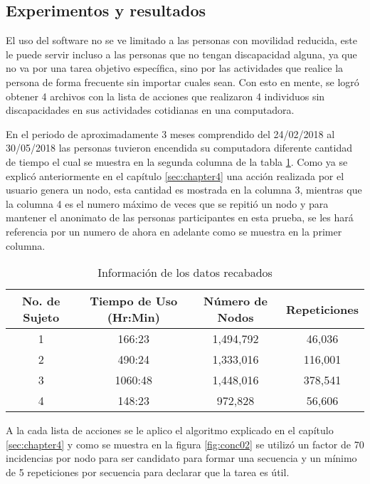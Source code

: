 \subsection{Experimentos y resultados}

El uso del software no se ve limitado a las personas con movilidad reducida, este le puede servir incluso a las personas que no tengan discapacidad alguna, ya que no va por una tarea objetivo espec\'ifica, sino por las actividades que realice la persona de forma frecuente sin importar cuales sean. Con esto en mente, se logr\'o obtener 4 archivos con la lista de acciones que realizaron 4 individuos sin discapacidades en sus actividades cotidianas en una computadora.


En el periodo de aproximadamente 3 meses comprendido del 24/02/2018 al 30/05/2018 las personas tuvieron encendida su computadora diferente cantidad de tiempo el cual se muestra en la segunda columna de la tabla \ref{infodata}. Como ya se explic\'o anteriormente en el cap\'itulo \ref{sec:chapter4} una acci\'on realizada por el usuario genera un nodo, esta cantidad es mostrada en la columna 3, mientras que la columna 4 es el numero m\'aximo de veces que se repiti\'o un nodo y para mantener el anonimato de las personas participantes en esta prueba, se les har\'a referencia por un numero de ahora en adelante como se muestra en la primer columna. 


\begin{table}[]
\centering
\begin{tabular}{cccc}
\hline
		No. de Sujeto	&   Tiempo de Uso (Hr:Min)		&	N\'umero de Nodos	&   Repeticiones 	\\   \hline
		1				&	166:23 						&	1,494,792			&	46,036				\\
		2				&	490:24						&	1,333,016			&	116,001				\\
		3				&	1060:48						&	1,448,016			&	378,541				\\
		4				&	148:23						&	972,828				&	56,606				\\ 
\hline
\end{tabular}
\caption{Informaci\'on de los datos recabados}
\label{infodata}
\end{table}

A la cada lista de acciones se le aplico el algoritmo explicado en el cap\'itulo \ref{sec:chapter4} y como se muestra en la figura \ref{fig:conc02} se utiliz\'o un factor de 70 incidencias por nodo para ser candidato para formar una secuencia y un m\'inimo de 5 repeticiones por secuencia para declarar que la tarea es \'util. 


